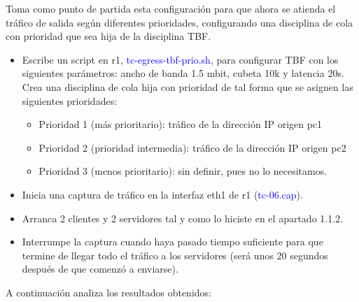 \documentclass[12pt, a4paper]{report}
\begin{document}
Toma como punto de partida esta configuración para que ahora se atienda el tráfico de salida según
diferentes prioridades, configurando una disciplina de cola con prioridad que sea hija de la disciplina
TBF.
\begin{itemize}
	\item Escribe un script en r1, \textcolor{blue}{tc-egress-tbf-prio.sh}, para configurar TBF con los siguientes
	parámetros: ancho de banda 1.5 mbit, cubeta 10k y latencia 20s. Crea una disciplina de cola hija con prioridad de tal forma que se asignen las siguientes prioridades:
	\begin{itemize}
		\item Prioridad 1 (más prioritario): tráfico de la dirección IP origen pc1
		\item Prioridad 2 (prioridad intermedia): tráfico de la dirección IP origen pc2
		\item Prioridad 3 (menos prioritario): sin definir, pues no lo necesitamos.
	\end{itemize}
	\item Inicia una captura de tráfico en la interfaz eth1 de r1 (\textcolor{blue}{tc-06.cap}).
	\item Arranca 2 clientes y 2 servidores tal y como lo hiciste en el apartado 1.1.2.
	\item Interrumpe la captura cuando haya pasado tiempo suficiente para que termine de llegar todo el
	tráfico a los servidores (será unos 20 segundos después de que comenzó a enviarse).
\end{itemize}
A continuación analiza los resultados obtenidos:
\end{document}

